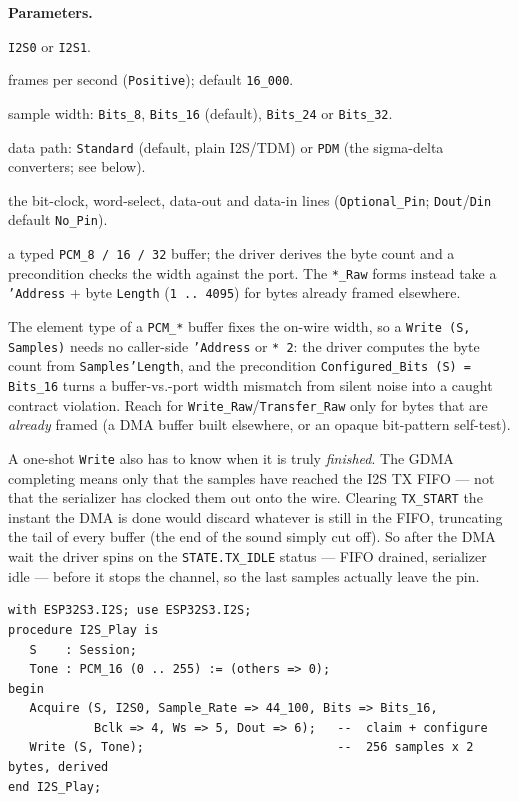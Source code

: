 \textbf{Parameters.}
\begin{description}[style=nextline]
\item[\texttt{Port}] \texttt{I2S0} or \texttt{I2S1}.
\item[\texttt{Sample\_Rate}] frames per second (\texttt{Positive}); default
  \texttt{16\_000}.
\item[\texttt{Bits}] sample width: \texttt{Bits\_8}, \texttt{Bits\_16} (default),
  \texttt{Bits\_24} or \texttt{Bits\_32}.
\item[\texttt{Mode}] data path: \texttt{Standard} (default, plain I2S/TDM) or
  \texttt{PDM} (the sigma-delta converters; see below).
\item[\texttt{Bclk}, \texttt{Ws}, \texttt{Dout}, \texttt{Din}] the bit-clock,
  word-select, data-out and data-in lines (\texttt{Optional\_Pin};
  \texttt{Dout}/\texttt{Din} default \texttt{No\_Pin}).
\item[\texttt{Samples}] a typed \texttt{PCM\_8\,/\,16\,/\,32} buffer; the driver
  derives the byte count and a precondition checks the width against the port.
  The \texttt{*\_Raw} forms instead take a \texttt{'Address} + byte
  \texttt{Length} (\texttt{1\,..\,4095}) for bytes already framed elsewhere.
\end{description}

The element type of a \texttt{PCM\_*} buffer fixes the on-wire width, so a
\texttt{Write\,(S,\,Samples)} needs no caller-side \texttt{'Address} or
\texttt{*\,2}: the driver computes the byte count from \texttt{Samples'Length},
and the precondition \texttt{Configured\_Bits\,(S)\,=\,Bits\_16} turns a
buffer-vs.-port width mismatch from silent noise into a caught contract
violation. Reach for \texttt{Write\_Raw}/\texttt{Transfer\_Raw} only for bytes
that are \emph{already} framed (a DMA buffer built elsewhere, or an opaque
bit-pattern self-test).

A one-shot \texttt{Write} also has to know when it is truly \emph{finished}. The
GDMA completing means only that the samples have reached the I2S TX FIFO --- not
that the serializer has clocked them out onto the wire. Clearing \texttt{TX\_START}
the instant the DMA is done would discard whatever is still in the FIFO, truncating
the tail of every buffer (the end of the sound simply cut off). So after the DMA
wait the driver spins on the \texttt{STATE.TX\_IDLE} status --- FIFO drained,
serializer idle --- before it stops the channel, so the last samples actually leave
the pin.

\begin{lstlisting}
with ESP32S3.I2S; use ESP32S3.I2S;
procedure I2S_Play is
   S    : Session;
   Tone : PCM_16 (0 .. 255) := (others => 0);
begin
   Acquire (S, I2S0, Sample_Rate => 44_100, Bits => Bits_16,
            Bclk => 4, Ws => 5, Dout => 6);   --  claim + configure
   Write (S, Tone);                           --  256 samples x 2 bytes, derived
end I2S_Play;
\end{lstlisting}

